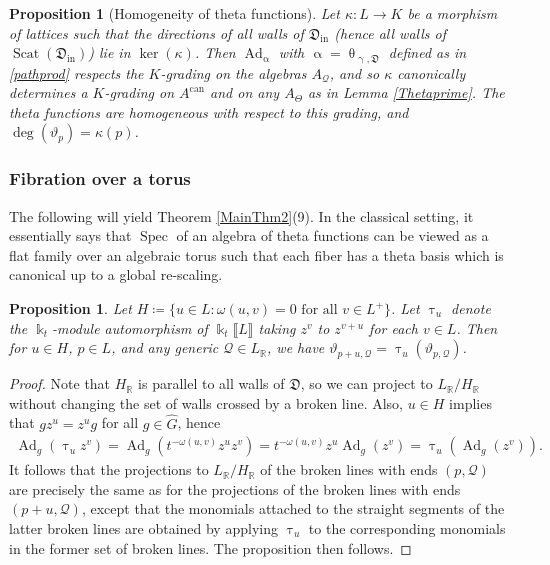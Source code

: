 \documentclass{amsart}
\DeclareMathOperator{\Spec}{Spec}
\DeclareMathOperator{\In}{in}
\DeclareMathOperator{\Ad}{Ad}
\DeclareMathOperator{\can}{can}
\DeclareMathOperator{\scat}{Scat}
\let\llb=\llbracket
\let\rrb=\rrbracket
\let\bb=\mathbb
\let\rar=\rightarrow
\let\f=\mathfrak
\let\s=\mathcal
\newcommand {\kk} {\Bbbk}
\newcommand {\sQ} {\mathcal{Q}}
\renewcommand{\theta}{\uptheta}
\renewcommand{\alpha}{\upalpha}
\renewcommand{\gamma}{\upgamma}
\renewcommand{\tau}{\uptau}
\theoremstyle{plain}%
\newtheorem{prop}[thm]{Proposition}
\theoremstyle{definition}
\theoremstyle{remark}
\begin{document}
\begin{prop}[Homogeneity of theta functions]\label{homprop}
Let $\kappa\colon L\rar K$ be a morphism of lattices such that the directions of all walls of $\f{D}_{\In}$ (hence all walls of $\scat(\f{D}_{\In})$) lie in $\ker(\kappa)$.  Then $\Ad_{\alpha}$ with $\alpha=\theta_{\gamma,\f{D}}$ defined as in \eqref{pathprod} respects the $K$-grading on the algebras $A_{\sQ}$, and so $\kappa$ canonically determines a $K$-grading on $A^{\can}$ and on any $A_{\Theta}$ as in Lemma \ref{Thetaprime}.  The theta functions are homogeneous with respect to this grading, and $\deg(\vartheta_p)=\kappa(p)$.  
\end{prop}


\subsubsection{Fibration over a torus}

The following will yield Theorem \ref{MainThm2}(9).  In the classical setting, it essentially says that $\Spec$ of an algebra of theta functions can be viewed as a flat family over an algebraic torus such that each fiber has a theta basis which is canonical up to a global re-scaling.

\begin{prop}\label{HV}
Let $H\coloneqq \{u\in L\colon \omega(u,v)=0 \mbox{ for all } v\in L^+\}$.  Let $\tau_u$ denote the $\kk_t$-module automorphism of $\kk_t\llb L\rrb$ taking $z^v$ to $z^{v+u}$ for each $v\in L$.  Then for $u\in H$, $p\in L$, and any generic $\sQ \in L_{\bb{R}}$, we have $\vartheta_{p+u,\sQ}=\tau_u(\vartheta_{p,\s{Q}})$.
\end{prop}
\begin{proof}
Note that $H_{\bb{R}}$ is parallel to all walls of $\f{D}$, so we can project to $L_{\bb{R}}/H_{\bb{R}}$ without changing the set of walls crossed by a broken line.  Also, $u\in H$ implies that $gz^u=z^u g$ for all $g\in \hat{G}$, hence
\begin{align*}
    \Ad_g(\tau_uz^v)=\Ad_g(t^{-\omega(u,v)}z^uz^v)=t^{-\omega(u,v)}z^u\Ad_g(z^v) = \tau_u(\Ad_g(z^v)).
\end{align*}
It follows that the projections to $L_{\bb{R}}/H_{\bb{R}}$ of the broken lines with ends $(p,\sQ)$ are precisely the same as for the projections of the broken lines with ends $(p+u,\sQ)$, except that the monomials attached to the straight segments of the latter broken lines are obtained by applying $\tau_u$ to the corresponding monomials in the former set of broken lines.  The proposition then follows.
\end{proof}
\end{document}
